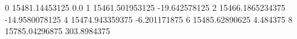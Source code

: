 0 15481.14453125 0.0
1 15461.501953125 -19.642578125
2 15466.1865234375 -14.9580078125
4 15474.943359375 -6.201171875
6 15485.62890625 4.484375
8 15785.04296875 303.8984375
